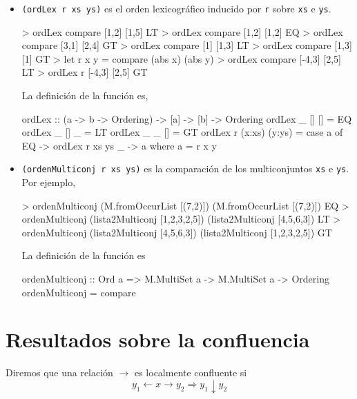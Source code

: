 \begin{itemize}
\item
{}
    \texttt{(ordLex r xs ys)} es el orden lexicográfico inducido por \texttt{r} sobre \texttt{xs} e \texttt{ys}. 
\begin{sesion}
> ordLex compare [1,2] [1,5]
LT
> ordLex compare [1,2] [1,2]
EQ
> ordLex compare [3,1] [2,4]
GT
> ordLex compare [1] [1,3]
LT
> ordLex compare [1,3] [1]
GT
> let r x y = compare (abs x) (abs y)
> ordLex compare [-4,3] [2,5]
LT
> ordLex r       [-4,3] [2,5]
GT
\end{sesion}
        
La definición de la función es,
       
\begin{codigo}
ordLex :: (a -> b -> Ordering) -> [a] -> [b] -> Ordering
ordLex _ [] []  = EQ
ordLex _ [] _   = LT
ordLex _ _  []  = GT
ordLex r (x:xs) (y:ys) = 
    case a of 
      EQ -> ordLex r xs ys
      _  -> a 
    where a = r x y
\end{codigo}      

\item {} \texttt{(ordenMulticonj r xs
    ys)} es la comparación de los multiconjuntos \texttt{xs} e
  \texttt{ys}. Por ejemplo,
\begin{sesion}
> ordenMulticonj (M.fromOccurList [(7,2)])  
  (M.fromOccurList [(7,2)])
EQ
> ordenMulticonj (lista2Multiconj [1,2,3,2,5]) 
  (lista2Multiconj [4,5,6,3])
LT
> ordenMulticonj (lista2Multiconj [4,5,6,3]) 
  (lista2Multiconj [1,2,3,2,5])
GT
\end{sesion}
        
La definición de la función es
        
\begin{codigo}
ordenMulticonj :: Ord a => M.MultiSet a -> M.MultiSet a 
                  -> Ordering
ordenMulticonj = compare
\end{codigo}

\end{itemize}

\section{Resultados sobre la confluencia}

\begin{defi} 
  Diremos que una relación $\rightarrow$ es localmente confluente si
  \[
    y_1 \leftarrow x \rightarrow y_2 \Rightarrow y_1 \downarrow y_2
  \] 
\end{defi}      

